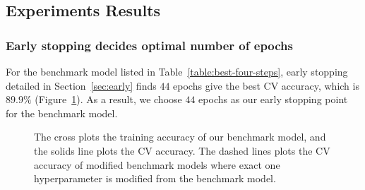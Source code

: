 \subsection{Experiments Results}
\subsubsection{Early stopping decides optimal number of epochs}
For the benchmark model listed in Table~\ref{table:best-four-steps}, early stopping detailed in Section~\ref{sec:early} finds $44$ epochs give the best CV accuracy, which is $89.9\%$ (Figure~\ref{fig:acc-iter}). As a result, we choose $44$ epochs as our early stopping point for the benchmark model.
\begin{figure}
    \caption{The cross plots the training accuracy of our benchmark model, and the  solids line plots the CV accuracy. The dashed lines plots the CV accuracy of modified benchmark models where exact one hyperparameter is modified from the benchmark model.}
    \label{fig:acc-iter}
\end{figure}

